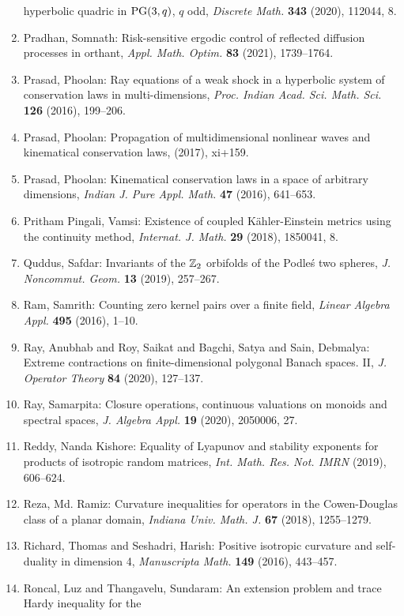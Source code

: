 \begin{enumerate}
hyperbolic quadric in {${\rm PG} (3,q)$}, {$q$} odd, \emph{Discrete Math.} {\bf 343} (2020), 112044, 8.
\item Pradhan, Somnath: Risk-sensitive ergodic control of reflected diffusion
processes in orthant, \emph{Appl. Math. Optim.} {\bf 83} (2021), 1739--1764.
\item Prasad, Phoolan: Ray equations of a weak shock in a hyperbolic system of
conservation laws in multi-dimensions, \emph{Proc. Indian Acad. Sci. Math. Sci.} {\bf 126} (2016), 199--206.
\item Prasad, Phoolan: Propagation of multidimensional nonlinear waves and
kinematical conservation laws, \emph{} {\bf } (2017), xi+159.
\item Prasad, Phoolan: Kinematical conservation laws in a space of arbitrary
dimensions, \emph{Indian J. Pure Appl. Math.} {\bf 47} (2016), 641--653.
\item Pritham Pingali, Vamsi: Existence of coupled {K}\"{a}hler-{E}instein metrics using the
continuity method, \emph{Internat. J. Math.} {\bf 29} (2018), 1850041, 8.
\item Quddus, Safdar: Invariants of the {$\Bbb Z_2$} orbifolds of the {P}odle\'{s} two
spheres, \emph{J. Noncommut. Geom.} {\bf 13} (2019), 257--267.
\item Ram, Samrith: Counting zero kernel pairs over a finite field, \emph{Linear Algebra Appl.} {\bf 495} (2016), 1--10.
\item Ray, Anubhab and Roy, Saikat and Bagchi, Satya and Sain,
Debmalya: Extreme contractions on finite-dimensional polygonal {B}anach
spaces. {II}, \emph{J. Operator Theory} {\bf 84} (2020), 127--137.
\item Ray, Samarpita: Closure operations, continuous valuations on monoids and
spectral spaces, \emph{J. Algebra Appl.} {\bf 19} (2020), 2050006, 27.
\item Reddy, Nanda Kishore: Equality of {L}yapunov and stability exponents for products of
isotropic random matrices, \emph{Int. Math. Res. Not. IMRN} {\bf } (2019), 606--624.
\item Reza, Md. Ramiz: Curvature inequalities for operators in the {C}owen-{D}ouglas
class of a planar domain, \emph{Indiana Univ. Math. J.} {\bf 67} (2018), 1255--1279.
\item Richard, Thomas and Seshadri, Harish: Positive isotropic curvature and self-duality in dimension 4, \emph{Manuscripta Math.} {\bf 149} (2016), 443--457.
\item Roncal, Luz and Thangavelu, Sundaram: An extension problem and trace {H}ardy inequality for the

\end{enumerate}
